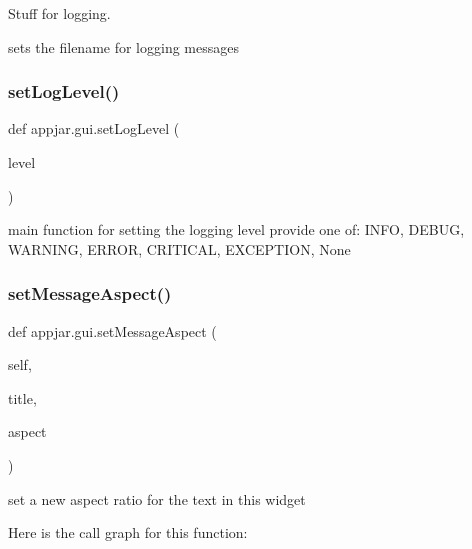 \begin{DoxyVerb}
Stuff for logging. 

\begin{DoxyVerb}sets the filename for logging messages \end{DoxyVerb}
 \mbox{\label{classappjar_1_1gui_abcb23d31c09c0f65e7464f154fae31db}} 
\subsubsection{\texorpdfstring{set\+Log\+Level()}{setLogLevel()}}
{\footnotesize\ttfamily def appjar.\+gui.\+set\+Log\+Level (\begin{DoxyParamCaption}\item[{}]{level }\end{DoxyParamCaption})\hspace{0.3cm}{\ttfamily [static]}}

\begin{DoxyVerb}main function for setting the logging level
    provide one of: INFO, DEBUG, WARNING, ERROR, CRITICAL, EXCEPTION, None \end{DoxyVerb}
 \mbox{\label{classappjar_1_1gui_a6847f01b0c4922f9941e81d0317a313a}} 
\subsubsection{\texorpdfstring{set\+Message\+Aspect()}{setMessageAspect()}}
{\footnotesize\ttfamily def appjar.\+gui.\+set\+Message\+Aspect (\begin{DoxyParamCaption}\item[{}]{self,  }\item[{}]{title,  }\item[{}]{aspect }\end{DoxyParamCaption})}

\begin{DoxyVerb}set a new aspect ratio for the text in this widget \end{DoxyVerb}
 Here is the call graph for this function\+:
\mbox{\label{classappjar_1_1gui_a125479cea0bdfeb13d758629183c3bbc}} 

\end{DoxyVerb}
